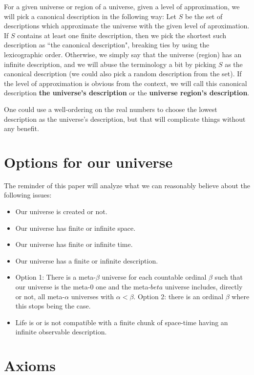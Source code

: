\documentclass[a4paper
,draft
]{article}
\newcommand{\definitie}[1]{\textbf{#1}}
\newcommand{\ghilimele}[1]{``#1"}
\begin{document}
For a given universe or region of a universe,
given a level of approximation, we will pick a canonical description
in the following way: Let $S$ be the set of descriptions which approximate
the universe with the given level of aproximation. If $S$ contains
at least one finite description, then we pick the shortest such
description as \ghilimele{the canonical description}, breaking ties by
using the lexicographic order. Otherwise, we simply say that the
universe (region) has an infinite description, and we will abuse the
terminology a bit by picking $S$ as the canonical description (we could
also pick a random description from the set).
If the level of approximation is obvious from the context, we will call
this canonical description \definitie{the universe's description}
or the \definitie{universe region's description}.

One could use a well-ordering on the real numbers to choose the
lowest description as the universe's description, but that will
complicate things without any benefit.

\section{Options for our universe}

The reminder of this paper will analyze what we can reasonably believe about
the following issues:
\begin{itemize}
  \item Our universe is created or not.
  \item Our universe has finite or infinite space.
  \item Our universe has finite or infinite time.
  \item Our universe has a finite or infinite description.
  \item Option 1: There is a meta-$\beta$ universe for each countable ordinal
        $\beta$ such that our universe is the meta-$0$ one and the meta-$beta$
        universe includes, directly or not, all meta-$\alpha$ universes with
        $\alpha < \beta$. Option 2: there is an ordinal $\beta$ where this
        stops being the case.
  \item Life is or is not compatible with a finite chunk of space-time having
        an infinite observable description.
\end{itemize}

\section{Axioms}
\label{sec:axioms}
\end{document}
